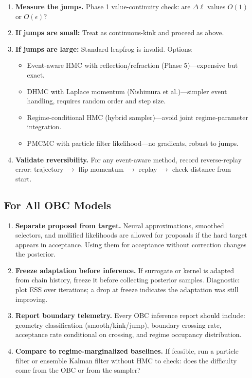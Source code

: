 \begin{enumerate}
  \item \textbf{Measure the jumps.} Phase 1 value-continuity check: are
    $\Delta \ell$ values $O(1)$ or $O(\epsilon)$?
  \item \textbf{If jumps are small:} Treat as continuous-kink and proceed as
    above.
  \item \textbf{If jumps are large:} Standard leapfrog is invalid. Options:
    \begin{itemize}
      \item Event-aware HMC with reflection/refraction (Phase 5)—expensive but
        exact.
      \item DHMC with Laplace momentum (Nishimura et al.)—simpler event
        handling, requires random order and step size.
      \item Regime-conditional HMC (hybrid sampler)—avoid joint regime-parameter
        integration.
      \item PMCMC with particle filter likelihood—no gradients, robust to
        jumps.
    \end{itemize}
  \item \textbf{Validate reversibility.} For any event-aware method, record
    reverse-replay error: trajectory $\to$ flip momentum $\to$ replay $\to$
    check distance from start.
\end{enumerate}

\subsection{For All OBC Models}

\begin{enumerate}
  \item \textbf{Separate proposal from target.} Neural approximations,
    smoothed selectors, and mollified likelihoods are allowed for proposals if
    the hard target appears in acceptance. Using them for acceptance without
    correction changes the posterior.
  \item \textbf{Freeze adaptation before inference.} If surrogate or kernel is
    adapted from chain history, freeze it before collecting posterior samples.
    Diagnostic: plot ESS over iterations; a drop at freeze indicates the
    adaptation was still improving.
  \item \textbf{Report boundary telemetry.} Every OBC inference report should
    include: geometry classification (smooth/kink/jump), boundary crossing
    rate, acceptance rate conditional on crossing, and regime occupancy
    distribution.
  \item \textbf{Compare to regime-marginalized baselines.} If feasible, run a
    particle filter or ensemble Kalman filter without HMC to check: does the
    difficulty come from the OBC or from the sampler?
\end{enumerate}

